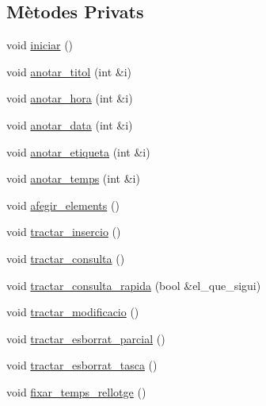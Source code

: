 \subsection*{Mètodes Privats}
\begin{DoxyCompactItemize}
\item 
void \hyperlink{class_comanda_a57a4df9cbf2f41ebbd36270f867e8694}{iniciar} ()
\item 
void \hyperlink{class_comanda_a97ba2fd8c8b5a6d8007efdbfbbcb3fae}{anotar\-\_\-titol} (int \&i)
\item 
void \hyperlink{class_comanda_a0a5bbe87d1bc18bb46b303d167c1794a}{anotar\-\_\-hora} (int \&i)
\item 
void \hyperlink{class_comanda_a77134aa747d804e8d62aba6f2e443eec}{anotar\-\_\-data} (int \&i)
\item 
void \hyperlink{class_comanda_acd79aaef42e1df67426e92b588c793f6}{anotar\-\_\-etiqueta} (int \&i)
\item 
void \hyperlink{class_comanda_a32cf8807dce80ccd10b23d3c420be570}{anotar\-\_\-temps} (int \&i)
\item 
void \hyperlink{class_comanda_a6394f34d947899ee711c598ad65882c5}{afegir\-\_\-elements} ()
\item 
void \hyperlink{class_comanda_a2d6b1de1d935c3441b854165a30b6992}{tractar\-\_\-insercio} ()
\item 
void \hyperlink{class_comanda_afdfd9d24c135a173a87e3f6a406358d7}{tractar\-\_\-consulta} ()
\item 
void \hyperlink{class_comanda_ae431b547161b575907fb0a093b0741bb}{tractar\-\_\-consulta\-\_\-rapida} (bool \&el\-\_\-que\-\_\-sigui)
\item 
void \hyperlink{class_comanda_ad217f019b2d65827a0dba40729311cff}{tractar\-\_\-modificacio} ()
\item 
void \hyperlink{class_comanda_a6b70b1eafbfc69798994a5c23d3885b9}{tractar\-\_\-esborrat\-\_\-parcial} ()
\item 
void \hyperlink{class_comanda_ac453d63201eed34d7c0570e257e6bee4}{tractar\-\_\-esborrat\-\_\-tasca} ()
\item 
void \hyperlink{class_comanda_a421912bd32984118974509a8620f8923}{fixar\-\_\-temps\-\_\-rellotge} ()
\end{DoxyCompactItemize}
